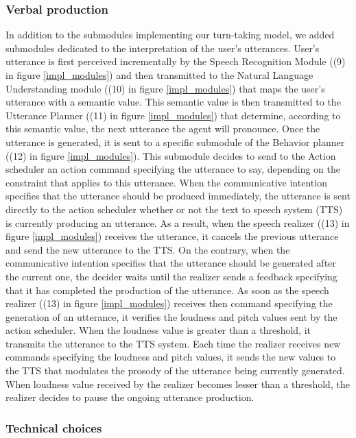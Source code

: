 \subsubsection{Verbal production}

In addition to the submodules implementing our turn-taking model, we added submodules dedicated to the interpretation of the user's utterances. 
User's utterance is first perceived incrementally by the Speech Recognition Module ((9) in figure \ref{impl_modules}) and then  transmitted to the Natural Language Understanding module ((10) in figure \ref{impl_modules}) that maps the user's utterance with a semantic value. This semantic value is then transmitted to the Utterance Planner ((11) in figure \ref{impl_modules}) that determine, according to this semantic value, the next utterance the agent will pronounce.  
Once the utterance is generated, it is sent to a specific submodule of the Behavior planner ((12) in figure \ref{impl_modules}). This submodule decides to send to the Action scheduler an action command specifying the utterance to say, depending on the constraint that applies to this utterance. When the communicative intention specifies that the utterance should be produced immediately, the utterance is sent directly to the action scheduler whether or not the text to speech system (TTS) is currently producing an utterance. As a result, when the speech realizer ((13) in figure \ref{impl_modules}) receives the utterance, it cancels the previous utterance and send the new utterance to the TTS. On the contrary, when the communicative intention specifies that the utterance should be generated after the current one, the decider waits until the realizer sends a feedback specifying that it has completed the production of the utterance.
As soon as the speech realizer ((13) in figure \ref{impl_modules}) receives then command specifying the generation of an utterance, it verifies the loudness and pitch values sent by the action scheduler. When the loudness value is greater than a threshold, it transmits the utterance to the TTS system. Each time the realizer receives new commands specifying the loudness and pitch values, it sends the new values to the TTS that modulates the prosody of the utterance being currently generated. When loudness value received by the realizer becomes lesser than a threshold, the realizer decides to pause the ongoing utterance production.

\subsubsection{Technical choices}


